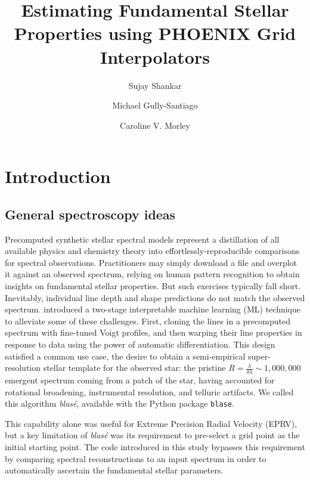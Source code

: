 \documentclass[twocolumn]{aastex631}
\begin{document}
\title{Estimating Fundamental Stellar Properties using PHOENIX Grid Interpolators}

\author[0000-0002-2290-6810]{Sujay Shankar}
\author[0000-0002-4020-3457]{Michael Gully-Santiago}
\author[0000-0002-4404-0456]{Caroline V. Morley}

\begin{abstract}
    \blindtext
\end{abstract}

\keywords{}


\section{Introduction}



\subsection{General spectroscopy ideas}

Precomputed synthetic stellar spectral models represent a distillation of all available physics
and chemistry theory into effortlessly-reproducible comparisons for spectral observations.  
Practitioners may simply download a file and overplot it against an observed spectrum, relying on 
human pattern recognition to obtain insights on fundamental stellar properties. But such exercises 
typically fall short. Inevitably, individual line depth and shape predictions do not match the 
observed spectrum. \citet{2022ApJ...941..200G} introduced a two-stage interpretable machine learning (ML) 
technique to alleviate some of these challenges. First, cloning the lines in a precomputed spectrum 
with fine-tuned Voigt profiles, and then warping their line properties in response to data using 
the power of automatic differentiation. This design satisfied a common use case, the desire to 
obtain a semi-empirical super-resolution stellar template for the observed star: the pristine 
$R=\frac{\lambda}{\delta \lambda}\sim1,000,000$ emergent spectrum coming from a patch of the star, 
having accounted for rotational broadening, instrumental resolution, and telluric artifacts. 
We called this algorithm \emph{blas\'e}, available with the Python package \texttt{blase}.

This capability alone was useful for Extreme Precision Radial Velocity (EPRV), but a key limitation 
of \emph{blas\'e} was its requirement to pre-select a grid point as the initial starting point. The code
introduced in this study bypasses this requirement by comparing spectral reconstructions to an input
spectrum in order to automatically ascertain the fundamental stellar parameters.
\end{document}
